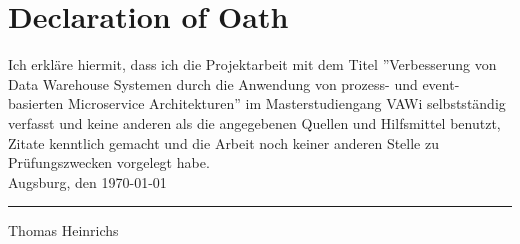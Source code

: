 \section*{Declaration of Oath}

Ich erkläre hiermit, dass ich die Projektarbeit mit dem Titel ''Verbesserung von Data Warehouse Systemen durch die Anwendung von prozess- und event- basierten Microservice Architekturen'' im Masterstudiengang VAWi selbstständig verfasst und keine anderen als die angegebenen Quellen und Hilfsmittel benutzt, Zitate kenntlich gemacht und die Arbeit noch keiner anderen Stelle zu Prüfungszwecken vorgelegt habe. \newline \\[0.5cm]
Augsburg, den \today \newline \\[1cm]
\hfill\parbox{4cm}{\hrule
\strut \centering\footnotesize Thomas Heinrichs}
\newpage
